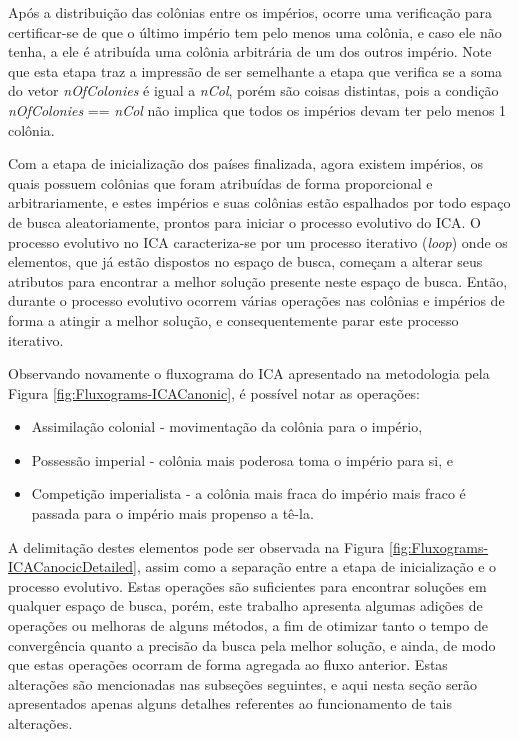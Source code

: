Após a distribuição das colônias entre os impérios, ocorre uma verificação para certificar-se de que o último império tem pelo menos uma colônia, e caso ele não tenha, a ele é atribuída uma colônia arbitrária de um dos outros império. Note que esta etapa traz a impressão de ser semelhante a etapa que verifica se a soma do vetor \emph{nOfColonies} é igual a \emph{nCol}, porém são coisas distintas, pois a condição \emph{nOfColonies} == \emph{nCol} não implica que todos os impérios devam ter pelo menos 1 colônia. 

Com a etapa de inicialização dos países finalizada, agora existem impérios, os quais possuem colônias que foram atribuídas de forma proporcional e arbitrariamente, e estes impérios e suas colônias estão espalhados por todo espaço de busca aleatoriamente, prontos para iniciar o processo evolutivo do ICA. O processo evolutivo no ICA caracteriza-se por um processo iterativo (\emph{loop}) onde os elementos, que já estão dispostos no espaço de busca, começam a alterar seus atributos para encontrar a melhor solução presente neste espaço de busca. Então, durante o processo evolutivo ocorrem várias operações nas colônias  e impérios de forma a atingir a melhor solução, e consequentemente parar este processo iterativo. 

Observando novamente o fluxograma do ICA apresentado na metodologia pela Figura \ref{fig:Fluxograms-ICACanonic}, é possível notar as operações:
\begin{itemize}
\item Assimilação colonial - movimentação da colônia para o império,
\item Possessão imperial - colônia mais poderosa toma o império para si, e
\item Competição imperialista - a colônia mais fraca do império mais fraco é passada para o império mais propenso a tê-la.
\end{itemize}

A delimitação destes elementos pode ser observada na Figura \ref{fig:Fluxograms-ICACanocicDetailed}, assim como a separação entre a etapa de inicialização e o processo evolutivo. Estas operações são suficientes para encontrar soluções em qualquer espaço de busca, porém, este trabalho apresenta algumas adições de operações  ou melhoras de alguns métodos, a fim de otimizar tanto o tempo de convergência quanto a precisão da busca pela melhor solução, e ainda, de modo que estas operações ocorram de forma agregada ao fluxo anterior. Estas alterações são mencionadas nas subseções seguintes, e aqui nesta seção serão apresentados apenas alguns detalhes referentes ao funcionamento de tais alterações. 

